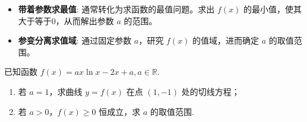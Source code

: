 \begin{theorem}[含参恒成立问题]
    \begin{itemize}
        \item \textbf{带着参数求最值}: 通常转化为求函数的最值问题。求出 $f(x)$ 的最小值，使其大于等于0，从而解出参数 $a$ 的范围。
        \item \textbf{参变分离求值域}: 通过固定参数 $a$，研究 $f(x)$ 的值域，进而确定 $a$ 的取值范围。
    \end{itemize}
\end{theorem}
\begin{example}
    已知函数 $f(x) = ax\ln x - 2x + a, a \in \mathbb{R}$.
    \begin{enumerate}
        \item[(1)] 若 $a = 1$，求曲线 $y = f(x)$ 在点 $(1, -1)$ 处的切线方程；
        \item[(2)] 若 $a > 0$，$f(x) \geq 0$ 恒成立，求 $a$ 的取值范围.
    \end{enumerate}
\end{example}

